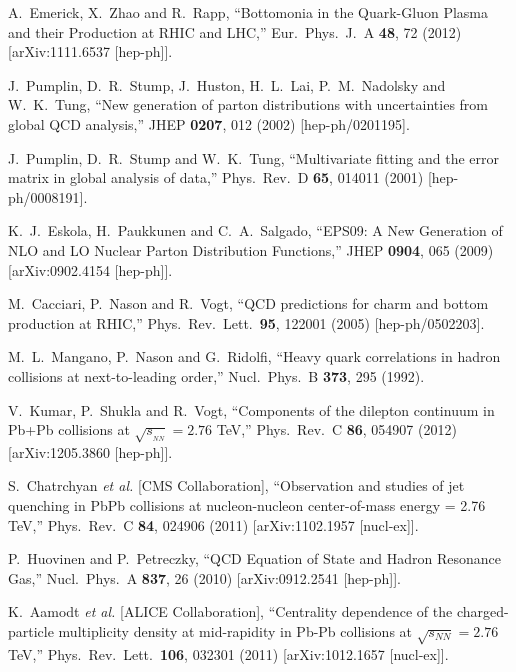 \documentclass[aps,prc,preprint,superscriptaddress,showpacs,showkeys]{revtex4-1}
\begin{document}
\begin{thebibliography}{100}
  A.~Emerick, X.~Zhao and R.~Rapp,
  ``Bottomonia in the Quark-Gluon Plasma and their Production at RHIC and LHC,''
  Eur.\ Phys.\ J.\ A {\bf 48}, 72 (2012)
  [arXiv:1111.6537 [hep-ph]].

  J.~Pumplin, D.~R.~Stump, J.~Huston, H.~L.~Lai, P.~M.~Nadolsky and W.~K.~Tung,
  ``New generation of parton distributions with uncertainties from global QCD analysis,''
  JHEP {\bf 0207}, 012 (2002)
  [hep-ph/0201195].

  J.~Pumplin, D.~R.~Stump and W.~K.~Tung,
  ``Multivariate fitting and the error matrix in global analysis of data,''
  Phys.\ Rev.\ D {\bf 65}, 014011 (2001)
  [hep-ph/0008191].

  K.~J.~Eskola, H.~Paukkunen and C.~A.~Salgado,
  ``EPS09: A New Generation of NLO and LO Nuclear Parton Distribution Functions,''
  JHEP {\bf 0904}, 065 (2009)
  [arXiv:0902.4154 [hep-ph]].

  M.~Cacciari, P.~Nason and R.~Vogt,
  ``QCD predictions for charm and bottom production at RHIC,''
  Phys.\ Rev.\ Lett.\  {\bf 95}, 122001 (2005)
  [hep-ph/0502203].

  M.~L.~Mangano, P.~Nason and G.~Ridolfi,
  ``Heavy quark correlations in hadron collisions at next-to-leading order,''
  Nucl.\ Phys.\ B {\bf 373}, 295 (1992).

  V.~Kumar, P.~Shukla and R.~Vogt,
  ``Components of the dilepton continuum in Pb+Pb collisions at $\sqrt{s_{_{NN}}} = 2.76 $ TeV,''
  Phys.\ Rev.\ C {\bf 86}, 054907 (2012)
  [arXiv:1205.3860 [hep-ph]].

  S.~Chatrchyan {\it et al.}  [CMS Collaboration],
  ``Observation and studies of jet quenching in PbPb collisions at nucleon-nucleon center-of-mass energy = 2.76 TeV,''
  Phys.\ Rev.\ C {\bf 84}, 024906 (2011)
  [arXiv:1102.1957 [nucl-ex]].

  P.~Huovinen and P.~Petreczky,
  ``QCD Equation of State and Hadron Resonance Gas,''
  Nucl.\ Phys.\ A {\bf 837}, 26 (2010)
  [arXiv:0912.2541 [hep-ph]].

  K.~Aamodt {\it et al.}  [ALICE Collaboration],
  ``Centrality dependence of the charged-particle multiplicity density at mid-rapidity in Pb-Pb collisions at $\sqrt{s_{NN}}=2.76$ TeV,''
  Phys.\ Rev.\ Lett.\  {\bf 106}, 032301 (2011)
  [arXiv:1012.1657 [nucl-ex]].
  

\end{thebibliography}
\end{document}

